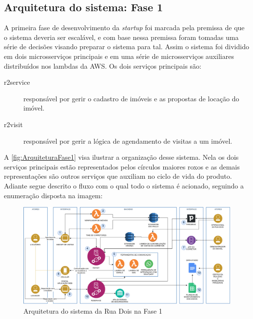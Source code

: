 \subsection{Arquitetura do sistema: Fase 1}
\label{sec:ArquiteturaFase1}

A primeira fase de desenvolvimento da \textit{startup} foi marcada pela premissa de
que o sistema deveria ser escalável, e com base nessa premissa foram tomadas uma
série de decisões visando preparar o sistema para tal. Assim o sistema foi dividido 
em dois microsserviços principais e em uma série de microsserviços auxiliares
distribuídos nos lambdas da AWS. Os dois serviços principais são:

    \begin{description}
        \item [r2service] responsável por gerir o cadastro de imóveis e as propostas
        de locação do imóvel.
        \item [r2visit] responsável por gerir a lógica de agendamento de visitas
        a um imóvel.
    \end{description}

A \autoref{fig:ArquiteturaFase1} visa ilustrar a organização desse sistema. Nela
os dois serviços principais estão representados pelos círculos maiores roxos e as
demais representações são outros serviços que auxiliam no ciclo de vida do produto.
Adiante segue descrito o fluxo com o qual todo o sistema é acionado, seguindo a
enumeração disposta na imagem:

\begin{figure}[h]
  \centering
  \caption{Arquitetura do sistema da Rua Dois na Fase 1\label{fig:ArquiteturaFase1}}
  \includegraphics[keepaspectratio=true,scale=0.3]{figuras/r2ArquiteturaFase1.eps}
\end{figure}

